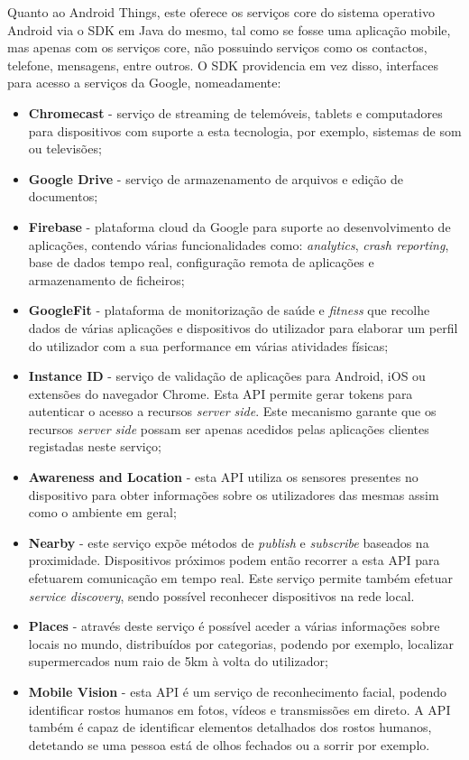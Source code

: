 Quanto ao Android Things, este oferece os serviços core do sistema operativo Android via o SDK em Java do mesmo, tal como se fosse uma aplicação mobile, mas apenas com os serviços core, não possuindo serviços como os contactos, telefone, mensagens, entre outros. O SDK providencia em vez disso, interfaces para acesso a serviços da Google, nomeadamente:

\begin{itemize}
\item \textbf{Chromecast} - serviço de streaming de telemóveis, tablets e computadores para dispositivos com suporte a esta tecnologia, por exemplo, sistemas de som ou televisões;
\item \textbf{Google Drive} - serviço de armazenamento de arquivos e edição de documentos;
\item \textbf{Firebase} - plataforma cloud da Google para suporte ao desenvolvimento de aplicações, contendo várias funcionalidades como: \textit{analytics}, \textit{crash reporting}, base de dados tempo real, configuração remota de aplicações e armazenamento de ficheiros;
\item \textbf{GoogleFit} - plataforma de monitorização de saúde e \textit{fitness} que recolhe dados de várias aplicações e dispositivos do utilizador para elaborar um perfil do utilizador com a sua performance em várias atividades físicas;
\item \textbf{Instance ID} - serviço de validação de aplicações para Android, iOS ou extensões do navegador Chrome. Esta API permite gerar tokens para autenticar o acesso a recursos \textit{server side}. Este mecanismo garante que os recursos \textit{server side} possam ser apenas acedidos pelas aplicações clientes registadas neste serviço;
\item \textbf{Awareness and Location} - esta API utiliza os sensores presentes no dispositivo para obter informações sobre os utilizadores das mesmas assim como o ambiente em geral;
\item \textbf{Nearby} - este serviço expõe métodos de \textit{publish} e \textit{subscribe} baseados na proximidade. Dispositivos próximos podem então recorrer a esta API para efetuarem comunicação em tempo real. Este serviço permite também efetuar \textit{service discovery}, sendo possível reconhecer dispositivos na rede local.
\item \textbf{Places} - através deste serviço é possível aceder a várias informações sobre locais no mundo, distribuídos por categorias, podendo por exemplo, localizar supermercados num raio de 5km à volta do utilizador;
\item \textbf{Mobile Vision} - esta API é um serviço de reconhecimento facial, podendo identificar rostos humanos em fotos, vídeos e transmissões em direto. A API também é capaz de identificar elementos detalhados dos rostos humanos, detetando se uma pessoa está de olhos fechados ou a sorrir por exemplo.
\end{itemize}

